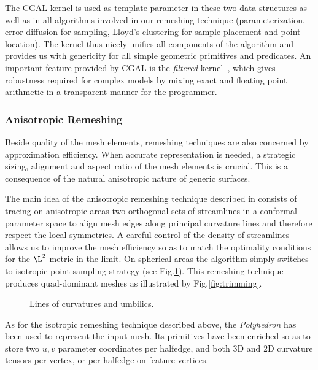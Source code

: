 The CGAL kernel is used as template parameter in these two data
structures as well as in all algorithms involved in our remeshing
technique (parameterization, error diffusion for sampling, Lloyd's
clustering for sample placement and point location). The kernel thus
nicely unifies all components of the algorithm and provides us with
genericity for all simple geometric primitives and predicates. An
important feature provided by CGAL is the \emph{filtered}
kernel~\cite{bbp-iayed-01,p-iaeia-99}, which gives robustness required
for complex models by mixing exact and floating point arithmetic in a
transparent manner for the programmer.

\subsubsection{Anisotropic Remeshing}


Beside quality of the mesh elements, remeshing techniques are also
concerned by approximation efficiency. When accurate representation is
needed, a strategic sizing, alignment and aspect ratio of the mesh
elements is crucial. This is a consequence of the natural anisotropic
nature of generic surfaces.


The main idea of the anisotropic remeshing technique described in
\cite{acdld-apr-03} consists of tracing on anisotropic areas two 
orthogonal sets of streamlines in a conformal parameter space to align
mesh edges along principal curvature lines and therefore respect the
local symmetries. A careful control of the density of streamlines
allows us to improve the mesh efficiency so as to match the optimality
conditions for the $\L^2$ metric in the limit. On spherical areas the
algorithm simply switches to isotropic point sampling strategy (see
Fig.\ref{fig:anisotropic}). This remeshing technique produces
quad-dominant meshes as illustrated by Fig.\ref{fig:trimming}.

\begin{figure}
  \centering
  \caption{Lines of curvatures and umbilics.}
  \label{fig:anisotropic}
\end{figure}


As for the isotropic remeshing technique described above, the
\emph{Polyhedron} has been used to represent the input mesh. Its
primitives have been enriched so as to store two $u,v$ parameter
coordinates per halfedge, and both 3D and 2D curvature tensors per
vertex, or per halfedge on feature vertices.

